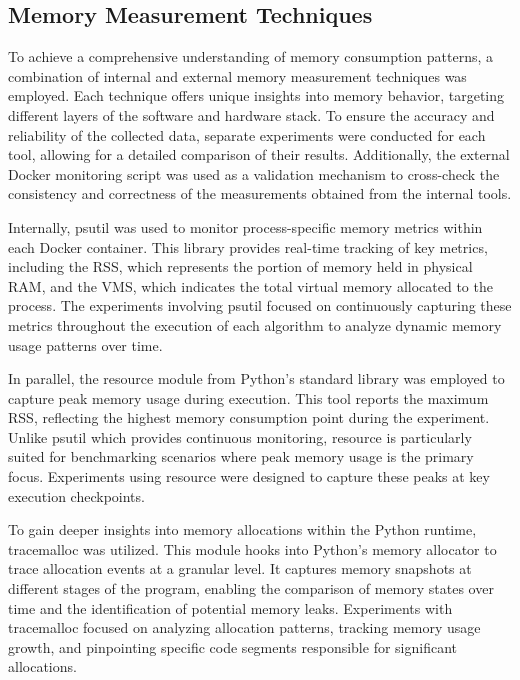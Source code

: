 \subsection{Memory Measurement Techniques}
\label{subsec:mmc-memory-measurement-techniques}

To achieve a comprehensive understanding of memory consumption patterns, a combination of internal and external memory measurement techniques was employed.
Each technique offers unique insights into memory behavior, targeting different layers of the software and hardware stack.
To ensure the accuracy and reliability of the collected data, separate experiments were conducted for each tool, allowing for a detailed comparison of their results.
Additionally, the external Docker monitoring script was used as a validation mechanism to cross-check the consistency and correctness of the measurements obtained from the internal tools.

Internally, psutil was used to monitor process-specific memory metrics within each Docker container.
This library provides real-time tracking of key metrics, including the \ac{RSS}, which represents the portion of memory held in physical \ac{RAM}, and the \ac{VMS}, which indicates the total virtual memory allocated to the process.
The experiments involving psutil focused on continuously capturing these metrics throughout the execution of each algorithm to analyze dynamic memory usage patterns over time.

In parallel, the resource module from Python’s standard library was employed to capture peak memory usage during execution.
This tool reports the maximum \ac{RSS}, reflecting the highest memory consumption point during the experiment.
Unlike psutil which provides continuous monitoring, resource is particularly suited for benchmarking scenarios where peak memory usage is the primary focus.
Experiments using resource were designed to capture these peaks at key execution checkpoints.

To gain deeper insights into memory allocations within the Python runtime, tracemalloc was utilized.
This module hooks into Python’s memory allocator to trace allocation events at a granular level.
It captures memory snapshots at different stages of the program, enabling the comparison of memory states over time and the identification of potential memory leaks.
Experiments with tracemalloc focused on analyzing allocation patterns, tracking memory usage growth, and pinpointing specific code segments responsible for significant allocations.

